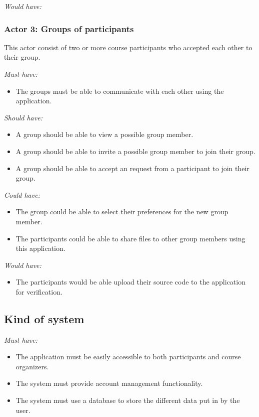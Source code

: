 \documentclass[]{article}
\newcommand{\reqr}[1]{{\noindent\emph{#1:}}}
\begin{document}
\reqr{Would have}


\subsubsection{Actor 3: Groups of participants}
This actor consist of two or more course participants who accepted each other to their group.

\reqr{Must have}
\begin{itemize}
\item The groups must be able to communicate with each other using the application.
\end{itemize}

\reqr{Should have}
\begin{itemize}
\item A group should be able to view a possible group member.
\item A group should be able to invite a possible group member to join their group.
\item A group should be able to accept an request from a participant to join their group.
\end{itemize}

\reqr{Could have}
\begin{itemize}
\item The group could be able to select their preferences for the new group member.
\item The participants could be able to share files to other group members using this application.
\end{itemize}

\reqr{Would have}
\begin{itemize}
\item The participants would be able upload their source code to the application for verification.
\end{itemize}

\subsection{Kind of system}

\reqr{Must have}
\begin{itemize}
\item The application must be easily accessible to both participants and course organizers.
\item The system must provide account management functionality.
\item The system must use a database to store the different data put in by the user.
\end{itemize}
\end{document}
